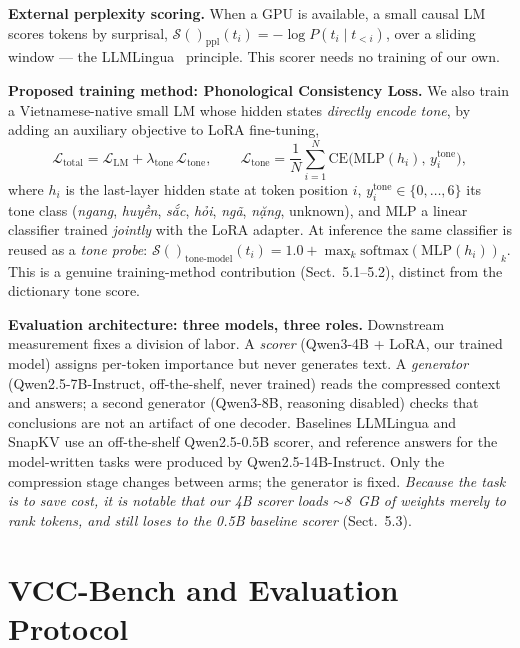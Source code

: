 \documentclass[runningheads]{llncs}
\newcommand{\tone}[1]{\textit{#1}}
\newcommand{\score}[1]{\mathcal{S}(#1)}
\begin{document}
\textbf{External perplexity scoring.} When a GPU is available, a small causal LM scores tokens by surprisal, $\score{}_{\text{ppl}}(t_i)=-\log P(t_i\mid t_{<i})$, over a sliding window --- the LLMLingua~\cite{jiang2023llmlingua} principle. This scorer needs no training of our own.

\textbf{Proposed training method: Phonological Consistency Loss.} We also train a Vietnamese-native small LM whose hidden states \emph{directly encode tone}, by adding an auxiliary objective to LoRA fine-tuning,
\begin{equation}
\mathcal{L}_{\text{total}} = \mathcal{L}_{\text{LM}} + \lambda_{\text{tone}}\,\mathcal{L}_{\text{tone}}, \qquad
\mathcal{L}_{\text{tone}} = \frac1N\sum_{i=1}^{N} \text{CE}\big(\text{MLP}(h_i),\, y_i^{\text{tone}}\big),
\label{eq:phon}
\end{equation}
where $h_i$ is the last-layer hidden state at token position $i$, $y_i^{\text{tone}}\in\{0,\ldots,6\}$ its tone class (\tone{ngang}, \tone{huyền}, \tone{sắc}, \tone{hỏi}, \tone{ngã}, \tone{nặng}, unknown), and $\text{MLP}$ a linear classifier trained \emph{jointly} with the LoRA adapter. At inference the same classifier is reused as a \emph{tone probe}: $\score{}_{\text{tone-model}}(t_i) = 1.0 + \max_k \text{softmax}(\text{MLP}(h_i))_k$. This is a genuine training-method contribution (Sect.~5.1--5.2), distinct from the dictionary tone score.

\textbf{Evaluation architecture: three models, three roles.} Downstream measurement fixes a division of labor. A \emph{scorer} (Qwen3-4B + LoRA, our trained model) assigns per-token importance but never generates text. A \emph{generator} (Qwen2.5-7B-Instruct, off-the-shelf, never trained) reads the compressed context and answers; a second generator (Qwen3-8B, reasoning disabled) checks that conclusions are not an artifact of one decoder. Baselines LLMLingua and SnapKV use an off-the-shelf Qwen2.5-0.5B scorer, and reference answers for the model-written tasks were produced by Qwen2.5-14B-Instruct. Only the compression stage changes between arms; the generator is fixed. \emph{Because the task is to save cost, it is notable that our 4B scorer loads $\sim$8~GB of weights merely to rank tokens, and still loses to the 0.5B baseline scorer} (Sect.~5.3).


\section{VCC-Bench and Evaluation Protocol}
\end{document}
